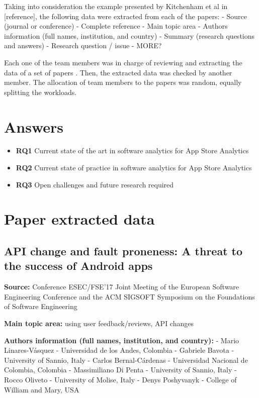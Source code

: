 \documentclass[]{book}
\begin{document}
Taking into consideration the example presented by Kitchenham et al in
{[}reference{]}, the following data were extracted from each of the
papers: - Source (journal or conference) - Complete reference - Main
topic area - Authors information (full names, institution, and country)
- Summary (research questions and answers) - Research question / issue -
MORE?

Each one of the team members was in charge of reviewing and extracting
the data of a set of papers . Then, the extracted data was checked by
another member. The allocation of team members to the papers was random,
equally splitting the workloads.

\section{Answers}\label{answers-4}

\begin{itemize}
\item
  \textbf{RQ1} Current state of the art in software analytics for App
  Store Analytics
\item
  \textbf{RQ2} Current state of practice in software analytics for App
  Store Analytics
\item
  \textbf{RQ3} Open challenges and future research required
\end{itemize}

\section{Paper extracted data}\label{paper-extracted-data}

\subsection{API change and fault proneness: A threat to the success of
Android
apps}\label{api-change-and-fault-proneness-a-threat-to-the-success-of-android-apps}

\textbf{Source:} Conference ESEC/FSE'17 Joint Meeting of the European
Software Engineering Conference and the ACM SIGSOFT Symposium on the
Foundations of Software Engineering

\textbf{Main topic area:} using user feedback/reviews, API changes

\textbf{Authors information (full names, institution, and country):} -
Mario Linares-Vásquez - Universidad de los Andes, Colombia - Gabriele
Bavota - University of Sannio, Italy - Carlos Bernal-Cárdenas -
Universidad Nacional de Colombia, Colombia - Massimiliano Di Penta -
University of Sannio, Italy - Rocco Oliveto - University of Molise,
Italy - Denys Poshyvanyk - College of William and Mary, USA
\end{document}
